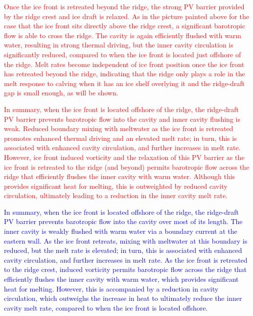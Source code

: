 \documentclass[draft]{agujournal2019}
\newcommand{\red}[1]{\textcolor{red}{#1}}
\newcommand{\blue}[1]{\textcolor{blue}{#1}}
\begin{document}
\red{Once the ice front is retreated beyond the ridge, the strong PV barrier provided by the ridge crest and ice draft is relaxed. As in the picture painted above for the case that the ice front sits directly above the ridge crest, a significant barotropic flow is able to cross the ridge. The cavity is again efficiently flushed with warm water, resulting in strong thermal driving, but the inner cavity circulation is significantly reduced, compared to when the ice front is located just offshore of the ridge. Melt rates become independent of ice front position once the ice front has retreated beyond the ridge, indicating that the ridge only plays a role in the melt response to calving when it has an ice shelf overlying it and the ridge-draft gap is small enough, as will be shown.}

\red{In summary, when the ice front is located offshore of the ridge, the ridge-draft PV barrier prevents barotropic flow into the cavity and inner cavity flushing is weak. Reduced boundary mixing with meltwater as the ice front is retreated promotes enhanced thermal driving and an elevated melt rate; in turn, this is associated with enhanced cavity circulation, and further increases in melt rate. However, ice front induced vorticity and the relaxation of this PV barrier as the ice front is retreated to the ridge (and beyond) permits barotropic flow across the ridge that efficiently flushes the inner cavity with warm water. Although this provides significant heat for melting, this is outweighted by reduced cavity circulation,  ultimately leading to a reduction in the inner cavity melt rate.}

\blue{In summary, when the ice front is located offshore of the ridge, the ridge-draft PV barrier prevents barotropic flow into the cavity over most of its length. The inner cavity is weakly flushed with warm water via a boundary current at the eastern wall. As the ice front retreats, mixing with meltwater at this boundary is reduced, but the melt rate is elevated; in turn, this is associated with enhanced cavity circulation, and further increases in melt rate. As the ice front is retreated to the ridge crest, induced vorticity permits barotropic flow across the ridge that efficiently flushes the inner cavity with warm water, which provides significant heat for melting. However, this is accompanied by a reduction in cavity circulation, which outweighs the increase in heat to ultimately reduce the inner cavity melt rate, compared to when the ice front is located offshore.}
\end{document}
